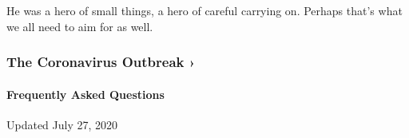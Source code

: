 He was a hero of small things, a hero of careful carrying on. Perhaps
that's what we all need to aim for as well.

\href{https://www.nytimes3xbfgragh.onion/news-event/coronavirus?action=click\&pgtype=Article\&state=default\&region=MAIN_CONTENT_3\&context=storylines_faq}{}

\hypertarget{the-coronavirus-outbreak-}{%
\subsubsection{The Coronavirus Outbreak
›}\label{the-coronavirus-outbreak-}}

\hypertarget{frequently-asked-questions}{%
\paragraph{Frequently Asked
Questions}\label{frequently-asked-questions}}

Updated July 27, 2020

